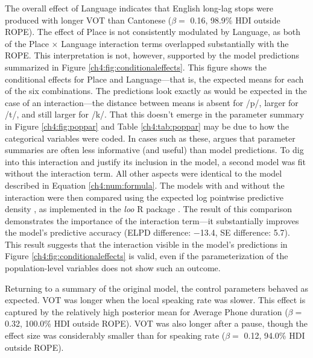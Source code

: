 The overall effect of Language indicates that English long-lag stops were produced with longer VOT than Cantonese ($\beta =$ 0.16, 98.9\% HDI outside ROPE). The effect of Place is not consistently modulated by Language, as both of the Place $\times$ Language interaction terms overlapped substantially with the ROPE. This interpretation is not, however, supported by the model predictions summarized in Figure \ref{ch4:fig:conditionaleffects}. This figure shows the conditional effects for Place and Language---that is, the expected means for each of the six combinations. The predictions look exactly as would be expected in the case of an interaction---the distance between means is absent for /p/, larger for /t/, and still larger for /k/. That this doesn't emerge in the parameter summary in Figure \ref{ch4:fig:poppar} and Table \ref{ch4:tab:poppar} may be due to how the categorical variables were coded. In cases such as these, \citet{mcelreath_2020_sr} argues that parameter summaries are often less informative (and useful) than model predictions. To dig into this interaction and justify its inclusion in the model, a second model was fit without the interaction term. All other aspects were identical to the model described in Equation \ref{ch4:num:formula}. The models with and without the interaction were then compared using the expected log pointwise predictive density \citep[ELPD][]{vehtari_2017_practical}, as implemented in the \textit{loo} R package \citep{vehtari_2020_loo}. The result of this comparison demonstrates the importance of the interaction term---it substantially improves the model's predictive accuracy (ELPD difference: $-$13.4, SE difference: 5.7). This result suggests that the interaction visible in the model's predictions in Figure \ref{ch4:fig:conditionaleffects} is valid, even if the parameterization of the population-level variables does not show such an outcome. 

Returning to a summary of the original model, the control parameters behaved as expected. VOT was longer when the local speaking rate was slower. This effect is captured by the relatively high posterior mean for Average Phone duration ($\beta =$ 0.32, 100.0\% HDI outside ROPE). VOT was also longer after a pause, though the effect size was considerably smaller than for speaking rate ($\beta =$ 0.12, 94.0\% HDI outside ROPE).

